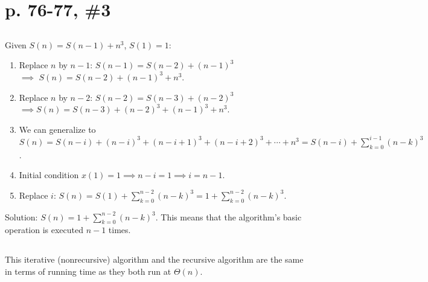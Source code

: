 \documentclass{article}
\begin{document}
\section{p. 76-77, \#3}

\subsection{}
Given $S(n) = S(n-1) + n^3$, $S(1) = 1$:
\begin{enumerate}
    \item Replace $n$ by $n-1$: $S(n-1) = S(n-2) + (n-1)^3$\\
          $\implies$ $S(n) = S(n-2) + (n-1)^3 + n^3$.
    \item Replace $n$ by $n-2$: $S(n-2) = S(n-3) + (n-2)^3$\\
          $\implies S(n) = S(n-3) + (n-2)^3 + (n-1)^3 + n^3$.
    \item We can generalize to $S(n) = S(n-i) + (n-i)^3 + (n-i+1)^3 + (n-i+2)^3 + \cdots + n^3 = S(n-i) + \sum_{k=0}^{i-1} (n-k)^3$. 
    \item Initial condition $x(1) = 1 \implies n - i = 1 \implies i = n-1$.
    \item Replace $i$: $S(n) = S(1) + \sum_{k=0}^{n-2} (n-k)^3 = 1 + \sum_{k=0}^{n-2} (n-k)^3$.
\end{enumerate}
Solution: $S(n) = 1 + \sum_{k=0}^{n-2} (n-k)^3$. This means that the algorithm's basic operation is executed $n-1$ times.

\subsection{}
This iterative (nonrecursive) algorithm and the recursive algorithm are the same in terms of running time as they both run at $\Theta(n)$.
\end{document}
